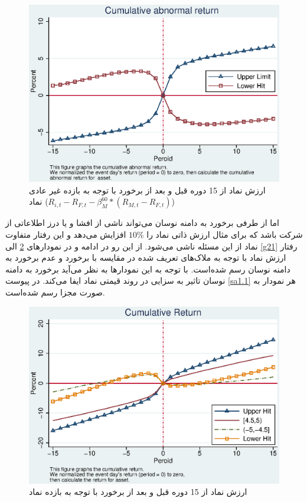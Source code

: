 \documentclass[12pt]{article}
\begin{document}
\begin{figure}[htbp]
\centering
\includegraphics[width=0.8\columnwidth]{AR.eps}
\caption{ارزش نماد از 15 دوره قبل  و بعد از برخورد با توجه به بازده غیر عادی نماد
($ R_{i,t} - R_{F,t} - \beta^{60}_M * (R_{M,t} - R_{F,t}) $)
}
\label{g12}
\end{figure}

\FloatBarrier
اما از طرفی برخورد به دامنه نوسان می‌تواند ناشی از افشا و یا درز اطلاعاتی از شرکت باشد که برای مثال ارزش ذاتی نماد را $ 10\% $ افزایش می‌دهد و این رفتار متفاوت نماد از این مسئله ناشی می‌شود. از این رو 
در ادامه و در نمودار‌های 
\ref{g19}
الی 
\ref{g21}
رفتار ارزش نماد با توجه به ملاک‌های تعریف شده در مقایسه با برخورد و عدم برخورد به دامنه نوسان رسم شده‌است. با توجه به این نمودار‌ها به نظر می‌آید برخورد به دامنه نوسان تاثیر به سزایی در روند قیمتی نماد ایفا می‌کند. در پیوست 
\ref{sa1.1}
هر نمودار به صورت مجزا رسم شده‌است.

\color{black}

\begin{figure}[htbp]
\centering
\includegraphics[width=0.8\columnwidth]{TR.eps}
\caption{ارزش نماد از 15 دوره قبل  و بعد از برخورد  با توجه به بازده نماد }
\label{g19}
\end{figure}
\end{document}
